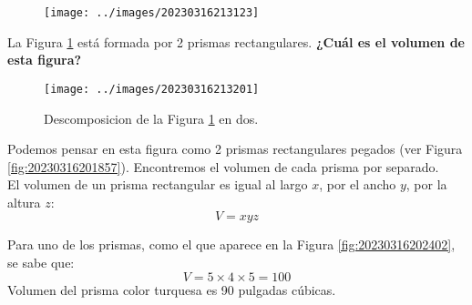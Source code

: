 \begin{multicols}{2}
    \begin{figure}[H]
        \centering
        \texttt{[image: ../images/20230316213123]}
        \caption{}
        \label{fig:20230316213123}
    \end{figure}
    \columnbreak
    La Figura \ref{fig:20230316213123} está formada por 2 prismas rectangulares.
    \textbf{¿Cuál es el volumen de esta figura?}
\end{multicols}

\begin{solutionbox}{16cm}
    \begin{minipage}[t]{.3\textwidth}
        \begin{figure}[H]
            \centering
            \texttt{[image: ../images/20230316213201]}
            \caption{Descomposicion de la Figura \ref{fig:20230316213123} en dos.}
            \label{fig:20230316213201}
        \end{figure}
    \end{minipage}\hfill
    \begin{minipage}[t]{.55\textwidth}
        Podemos pensar en esta figura como 2 prismas rectangulares pegados (ver Figura \ref{fig:20230316201857}). Encontremos el volumen de cada prisma por separado.\\
        El volumen de un prisma rectangular es igual al largo $x$, por el ancho $y$, por la altura $z$:
        \[ V = xyz \]

        Para uno de los prismas, como el que aparece en la Figura \ref{fig:20230316202402}, se sabe que:\\
        \[ V = 5\times 4\times 5=100\]
        Volumen del prisma color turquesa es 90 pulgadas cúbicas.\\


\end{minipage}
\end{solutionbox}
